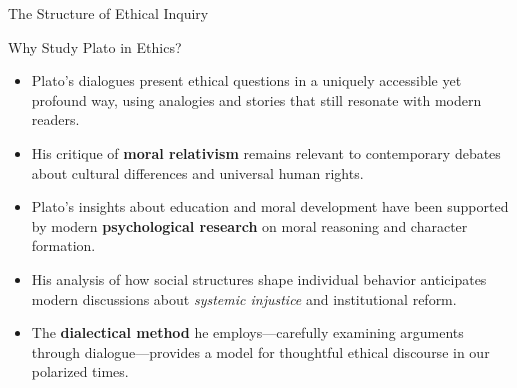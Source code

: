 \documentclass[aspectratio=169]{beamer}
\begin{document}
\begin{frame}{The Structure of Ethical Inquiry}
\begin{center}
\end{center}
\end{frame}

\begin{frame}{Why Study Plato in Ethics?}
\begin{itemize}
\item Plato's dialogues present ethical questions in a uniquely accessible yet profound way, using analogies and stories that still resonate with modern readers.
\item His critique of \textbf{moral relativism} remains relevant to contemporary debates about cultural differences and universal human rights.
\item Plato's insights about education and moral development have been supported by modern \textbf{psychological research} on moral reasoning and character formation.
\item His analysis of how social structures shape individual behavior anticipates modern discussions about \emph{systemic injustice} and institutional reform.
\item The \textbf{dialectical method} he employs—carefully examining arguments through dialogue—provides a model for thoughtful ethical discourse in our polarized times.
\end{itemize}
\end{frame}
\end{document}
